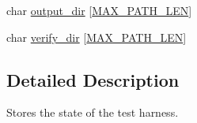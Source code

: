 \begin{DoxyCompactItemize}
\item 
char \hyperlink{struct_s_d_l_visual_test___harness_state_aafa9a2fb15490380b6c2edd704f4fcf0}{output\-\_\-dir} \mbox{[}\hyperlink{_s_d_l__visualtest__harness__argparser_8h_abdd33f362ae3bbdacb5de76473aa8a2f}{M\-A\-X\-\_\-\-P\-A\-T\-H\-\_\-\-L\-E\-N}\mbox{]}
\item 
char \hyperlink{struct_s_d_l_visual_test___harness_state_adc871112f24f61e2fff74a7a7fb9794f}{verify\-\_\-dir} \mbox{[}\hyperlink{_s_d_l__visualtest__harness__argparser_8h_abdd33f362ae3bbdacb5de76473aa8a2f}{M\-A\-X\-\_\-\-P\-A\-T\-H\-\_\-\-L\-E\-N}\mbox{]}
\end{DoxyCompactItemize}


\subsection{Detailed Description}
Stores the state of the test harness. 

